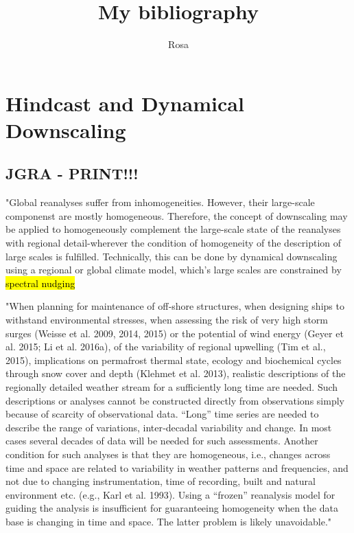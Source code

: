 \documentclass[12pt,a4paper]{article}
\title{My bibliography}
\author{Rosa}
\begin{document}
\maketitle
\tableofcontents

\section{Hindcast and Dynamical Downscaling }

\subsection{\cite{VonStorch2017} JGRA - PRINT!!!}

"Global reanalyses suffer from inhomogeneities. However, their large-scale componenst are mostly homogeneous. Therefore, the concept of downscaling may be applied to homogeneously complement the large-scale state of the reanalyses with regional detail-wherever the condition of homogeneity of the description of large scales is fulfilled. Technically, this can be done by dynamical downscaling using a regional or global climate model, which's large scales are constrained by \hl{spectral nudging}

"When planning for maintenance of off‐shore structures, when designing ships to withstand environmental stresses, when assessing the risk of very high storm surges (Weisse et al. 2009, 2014, 2015) or the potential of wind energy (Geyer et al. 2015; Li et al. 2016a), of the variability of regional upwelling (Tim et al., 2015), implications on permafrost thermal state, ecology and biochemical cycles through snow cover and depth (Klehmet et al. 2013), realistic descriptions of the regionally detailed weather stream for a sufficiently long time are needed. Such descriptions or analyses cannot be constructed directly from observations simply because of scarcity of observational data. “Long” time series are needed to describe the range of variations, inter‐decadal variability and change. In most cases several decades of data will be needed for such assessments. Another condition for such analyses is that they are homogeneous, i.e., changes across time and space are related to variability in weather patterns and frequencies, and not due to changing instrumentation, time of recording, built and natural environment etc. (e.g., Karl et al. 1993). Using a “frozen” reanalysis model for guiding the analysis is insufficient for guaranteeing homogeneity when the data base is changing in time and space. The latter problem is likely unavoidable."
\end{document}
